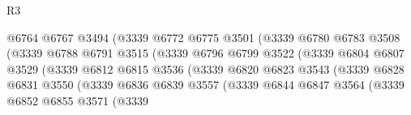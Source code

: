 \begin{lexlean}{R3}
\begin{coremodule}
                                      @6764
                                      @6767
                                      @3494
                                      (@3339
                                        @6772
                                        @6775
                                        @3501
                                        (@3339
                                          @6780
                                          @6783
                                          @3508
                                          (@3339
                                            @6788
                                            @6791
                                            @3515
                                            (@3339
                                              @6796
                                              @6799
                                              @3522
                                              (@3339
                                                @6804
                                                @6807
                                                @3529
                                                (@3339
                                                  @6812
                                                  @6815
                                                  @3536
                                                  (@3339
                                                    @6820
                                                    @6823
                                                    @3543
                                                    (@3339
                                                      @6828
                                                      @6831
                                                      @3550
                                                      (@3339
                                                        @6836
                                                        @6839
                                                        @3557
                                                        (@3339
                                                          @6844
                                                          @6847
                                                          @3564
                                                          (@3339
                                                            @6852
                                                            @6855
                                                            @3571
                                                            (@3339

\end{coremodule}
\end{lexlean}
